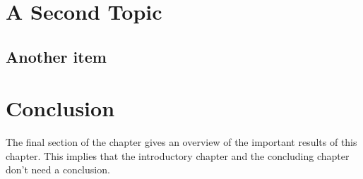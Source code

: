 \section{A Second Topic}
\lipsum[64]

\subsection{Another item}
\lipsum[56-57]

\section{Conclusion}
The final section of the chapter gives an overview of the important results
of this chapter. This implies that the introductory chapter and the
concluding chapter don't need a conclusion.

\lipsum[66]

